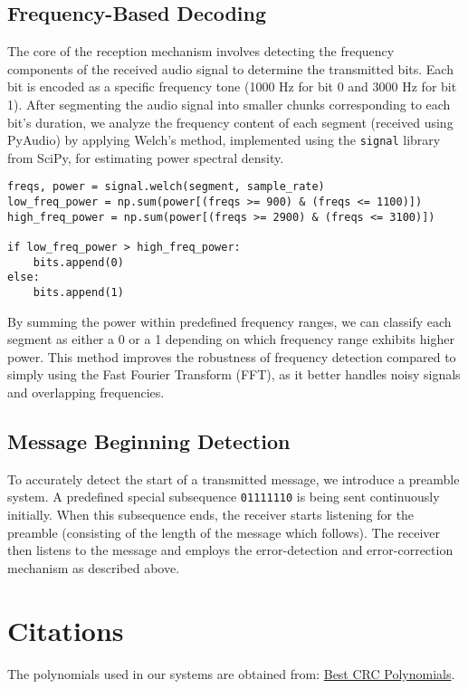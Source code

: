 \documentclass[11pt]{article}
\begin{document}
\subsection{Frequency-Based Decoding}

The core of the reception mechanism involves detecting the frequency components of the received audio signal to determine the transmitted bits. Each bit is encoded as a specific frequency tone (1000 Hz for bit 0 and 3000 Hz for bit 1). After segmenting the audio signal into smaller chunks corresponding to each bit's duration, we analyze the frequency content of each segment (received using PyAudio) by applying Welch's method, implemented using the \texttt{signal} library from SciPy, for estimating power spectral density.
\begin{tcolorbox}[colback=black!10!white, colframe=black]
    
\begin{verbatim} 
freqs, power = signal.welch(segment, sample_rate) 
low_freq_power = np.sum(power[(freqs >= 900) & (freqs <= 1100)])
high_freq_power = np.sum(power[(freqs >= 2900) & (freqs <= 3100)])

if low_freq_power > high_freq_power: 
    bits.append(0) 
else: 
    bits.append(1) \end{verbatim}
\end{tcolorbox}

By summing the power within predefined frequency ranges, we can classify each segment as either a 0 or a 1 depending on which frequency range exhibits higher power. This method improves the robustness of frequency detection compared to simply using the Fast Fourier Transform (FFT), as it better handles noisy signals and overlapping frequencies.

\subsection{Message Beginning Detection}
To accurately detect the start of a transmitted message, we introduce a preamble system. A predefined special subsequence \texttt{01111110} is being sent continuously initially. When this subsequence ends, the receiver starts listening for the preamble (consisting of the length of the message which follows). The receiver then listens to the message and employs the error-detection and error-correction mechanism as described above.

\section{Citations}
The polynomials used in our systems are obtained from: \href{https://users.ece.cmu.edu/~koopman/crc/hd5.html}{Best CRC Polynomials}.
\end{document}
